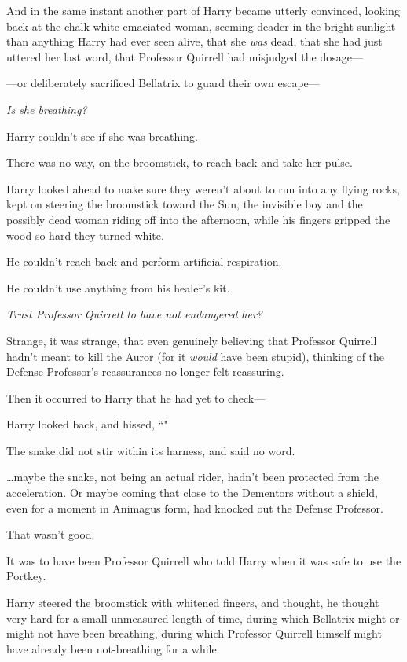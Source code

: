 And in the same instant another part of Harry became utterly convinced, looking back at the chalk-white emaciated woman, seeming deader in the bright sunlight than anything Harry had ever seen alive, that she \emph{was} dead, that she had just uttered her last word, that Professor Quirrell had misjudged the dosage—

—or deliberately sacrificed Bellatrix to guard their own escape—

\emph{Is she breathing?}

Harry couldn't see if she was breathing.

There was no way, on the broomstick, to reach back and take her pulse.

Harry looked ahead to make sure they weren't about to run into any flying rocks, kept on steering the broomstick toward the Sun, the invisible boy and the possibly dead woman riding off into the afternoon, while his fingers gripped the wood so hard they turned white.

He couldn't reach back and perform artificial respiration.

He couldn't use anything from his healer's kit.

\emph{Trust Professor Quirrell to have not endangered her?}

Strange, it was strange, that even genuinely believing that Professor Quirrell hadn't meant to kill the Auror (for it \emph{would} have been stupid), thinking of the Defense Professor's reassurances no longer felt reassuring.

Then it occurred to Harry that he had yet to check—

Harry looked back, and hissed, ``"

The snake did not stir within its harness, and said no word.

{\ldots}maybe the snake, not being an actual rider, hadn't been protected from the acceleration. Or maybe coming that close to the Dementors without a shield, even for a moment in Animagus form, had knocked out the Defense Professor.

That wasn't good.

It was to have been Professor Quirrell who told Harry when it was safe to use the Portkey.

Harry steered the broomstick with whitened fingers, and thought, he thought very hard for a small unmeasured length of time, during which Bellatrix might or might not have been breathing, during which Professor Quirrell himself might have already been not-breathing for a while.

